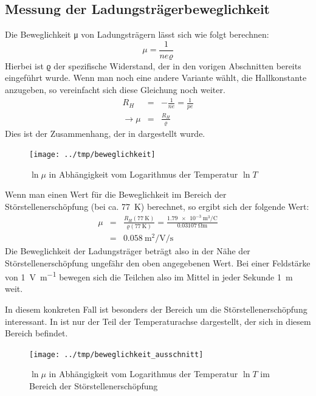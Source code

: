 \subsection{Messung der Ladungsträgerbeweglichkeit}

Die Beweglichkeit μ von Ladungsträgern lässt sich wie folgt berechnen:
\begin{equation}
μ = \frac{1}{neϱ}
\end{equation}
Hierbei ist ϱ der spezifische Widerstand, der in den vorigen Abschnitten
bereits eingeführt wurde. Wenn man noch eine andere Variante wählt, die
Hallkonstante anzugeben, so vereinfacht sich diese Gleichung noch weiter.
\begin{eqnarray}
R_H &=& -\frac{1}{ne} = \frac{1}{pe}\\
\rightarrow μ &=& \frac{R_H}{ϱ}
\end{eqnarray}
Dies ist der Zusammenhang, der in  dargestellt wurde.

\begin{figure}[htb]
   \centering
   \texttt{[image: ../tmp/beweglichkeit]}
   \caption{$\ln μ$ in Abhängigkeit vom Logarithmus der Temperatur $\ln T$}
   \label{fig:beweglichkeit}
\end{figure}

Wenn man einen Wert für die Beweglichkeit im Bereich der Störstellenerschöpfung
(bei ca. \SI{77}{\kelvin}) berechnet, so ergibt sich der folgende Wert:
\begin{eqnarray}
μ &=& \frac{R_H(\SI{77}{\kelvin})}{ϱ(\SI{77}{\kelvin})} =
\frac{\SI{1,79e-3}{\meter\cubed\per\coulomb}}{\SI{0.03107}{\ohm\meter}}\\
&=& \SI{0.058}{\meter\squared\per\volt\per\second}
\end{eqnarray}
Die Beweglichkeit der Ladungsträger beträgt also in der Nähe der
Störstellenerschöpfung ungefähr den oben angegebenen Wert. Bei einer Feldstärke
von \SI{1}{\volt\per\meter} bewegen sich die Teilchen also im Mittel in jeder
Sekunde \SI{1}{\meter} weit.

In diesem konkreten Fall ist besonders der Bereich um die
Störstellenerschöpfung interessant. In  ist nur
der Teil der Temperaturachse dargestellt, der sich in diesem Bereich befindet.

\begin{figure}[htb]
   \centering
   \texttt{[image: ../tmp/beweglichkeit\_ausschnitt]}
   \caption{$\ln μ$ in Abhängigkeit vom Logarithmus der Temperatur $\ln T$ im Bereich der Störstellenerschöpfung}
   \label{fig:beweglichkeit_ausschnitt}
\end{figure}

